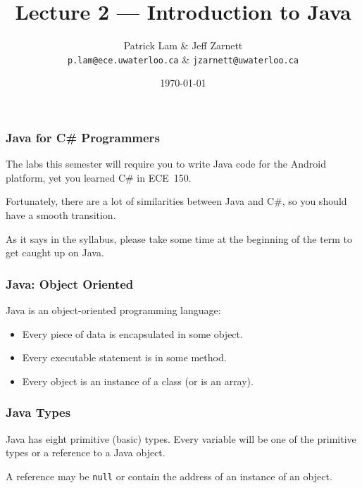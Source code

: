 

\usepackage{alltt}

\title{Lecture 2 --- Introduction to Java}

\author{Patrick Lam \& Jeff Zarnett \\ \small \texttt{p.lam@ece.uwaterloo.ca} \& \texttt{jzarnett@uwaterloo.ca}}
\date{\today}





\begin{frame}
  \titlepage
\end{frame}

\begin{frame}
\frametitle{Java for C\# Programmers}
\begin{changemargin}{1cm}
The labs this semester will require you to write Java
code for the Android platform, yet you learned C\# in ECE~150.


Fortunately, there are a lot of similarities between Java and C\#,
so you should have a smooth transition. 

As it says in the syllabus, please take some time at the beginning of the term to get caught up on Java. 


\end{changemargin}
\end{frame}

\begin{frame}
\frametitle{Java: Object Oriented}
\begin{changemargin}{1cm}

Java is an object-oriented programming language: 
\begin{itemize}
\item Every piece of data is encapsulated in some object.
\item Every executable statement is in some method.
\item Every object is an instance of a class (or is an array).
\end{itemize}

\end{changemargin}
\end{frame}

\begin{frame}
\frametitle{Java Types}
\begin{changemargin}{1cm}

Java has eight primitive (basic) types. Every variable will be one of the primitive types or a reference to a Java object.

A reference may be \texttt{null} or contain the address of an instance of an object. 

\end{changemargin}
\end{frame}

